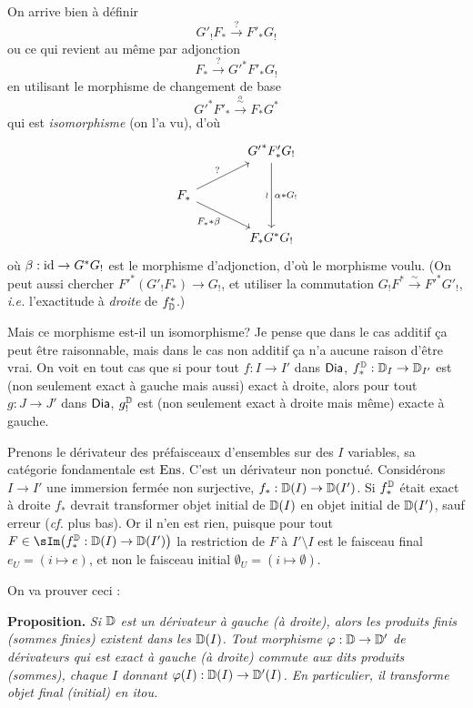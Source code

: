 
On arrive bien à définir
\[
G'_!F_* \xrightarrow{?} F'_*G_!
\]
ou ce qui revient au même par adjonction
\[
F_* \xrightarrow{?} {G'}^*F'_*G_!
\]
en utilisant le morphisme de changement de base
\[
{G'}^*F'_* \xrightarrow{\overset{\alpha}{\sim}} F_*G^*
\]
qui est \textit{isomorphisme} (on l'a vu), d'où
\[
\begin{tikzcd}[column sep=large, row sep=normal]
& {G'}^*F'_*G_! \arrow[dd, "\wr"', "\alpha * G_!"] \\
F_* \arrow[ur, "?"] \arrow[dr, "F_* * \beta"'] & \\
& F_*G^*G_!
\end{tikzcd}
\]
où $\beta : \mathrm{id} \to G^*G_!$ est le morphisme d'adjonction, d'où le morphisme voulu. (On peut aussi chercher ${F'}^*(G'_!F_*) \to G_!$, et utiliser la commutation $G_!F^* \overset{\sim}{\to} {F'}^*G'_!$, \textit{i.e.} l'exactitude à \textit{droite} de $f^*_{\mathbb{D}}$.)


Mais ce morphisme est-il un isomorphisme? Je pense que dans le cas additif ça peut être raisonnable, mais dans le cas non additif ça n'a aucune raison d'être vrai. On voit en tout cas que si pour tout $f : I \to I'$ dans $\mathsf{Dia}$, $f^{\mathbb{D}}_* : \mathbb{D}_I \to \mathbb{D}_{I'}$ est (non seulement exact à gauche mais aussi) exact à droite, alors pour tout $g : J \to J'$ dans $\mathsf{Dia}$, $g^{\mathbb{D}}_!$ est (non seulement exact à droite mais même) exacte à gauche. %

Prenons le dérivateur des préfaisceaux d'ensembles sur des $I$ variables, sa catégorie fondamentale est $\mathrm{Ens}$. C'est un dérivateur non ponctué. Considérons $I \to I'$ une immersion fermée non surjective, $f_* : \mathbb{D}(I) \to \mathbb{D}(I')$. Si $f^{\mathbb{D}}_*$ était exact à droite $f_*$ devrait transformer objet initial de $\mathbb{D}(I)$ en objet initial de $\mathbb{D}(I')$, sauf erreur (\textit{cf.} plus bas). Or il n'en est rien, puisque pour tout $F \in \sIm\bigl(f^{\D}_* : \D(I) \to \D(I')\bigr)$ la restriction de $F$ à $I' \setminus I$ est le faisceau final $e_U = (i \mapsto e)$, et non le faisceau initial $\emptyset_U = (i \mapsto \emptyset)$.

On va prouver ceci :

\textbf{Proposition.} \textit{Si $\mathbb{D}$ est un dérivateur à gauche (à droite), alors les produits finis (sommes finies) existent dans les $\mathbb{D}(I)$. Tout morphisme $\varphi : \mathbb{D} \to \mathbb{D}'$ de dérivateurs qui est exact à gauche (à droite) commute aux dits produits (sommes), chaque $I$ donnant $\varphi(I) : \mathbb{D}(I) \to \mathbb{D}'(I)$. En particulier, il transforme objet final (initial) en itou.}

